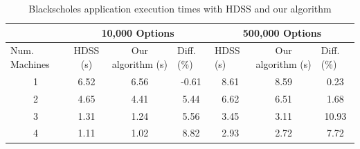 \documentclass[journal]{IEEEtran}
\begin{document}
\begin{table}[htb]
\centering
\caption{Blackscholes application execution times with HDSS and our algorithm}
\begin{scriptsize}
\begin{tabular}{c|c|c|c|c|c|c|}
\cline{2-7}
\multicolumn{1}{l|}{}                 & \multicolumn{3}{c|}{10,000 Options}                              & \multicolumn{3}{c|}{500,000 Options}                                                  \\ \hline
\multicolumn{1}{|l|}{Num. Machines} & HDSS (s) & Our algorithm (s) & \multicolumn{1}{l|}{Diff. (\%)} & \multicolumn{1}{l|}{HDSS (s)} & Our algorithm (s) & \multicolumn{1}{l|}{Diff. (\%)} \\ \hline
\multicolumn{1}{|c|}{1 }       & 6.52     & 6.56              &    -0.61                       
			 & 8.61                          & 8.59              &   0.23                         \\ \hline
\multicolumn{1}{|c|}{2 }      & 4.65     & 4.41              &    5.44                         
				& 6.62                          & 6.51              & 1.68                            \\ \hline
\multicolumn{1}{|c|}{3 }      & 1.31     & 1.24              & 5.56                            
			& 3.45                          & 3.11              &         10.93                    \\ \hline
\multicolumn{1}{|c|}{4 }      & 1.11     & 1.02              & 8.82                       
			    & 2.93                          & 2.72              &         7.72                  \\ \hline
\end{tabular}
\end{scriptsize}
\label{table: black}
\end{table}
\end{document}
